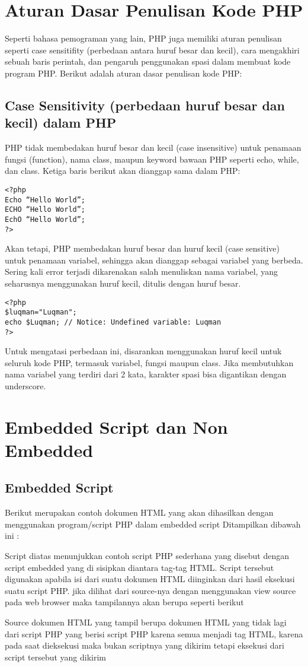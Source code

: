 \section{Aturan Dasar Penulisan Kode PHP}
Seperti bahasa pemograman yang lain, PHP juga memiliki aturan penulisan seperti case sensitifity (perbedaan antara huruf besar dan kecil), cara mengakhiri sebuah baris perintah, dan pengaruh penggunakan spasi dalam membuat kode program PHP. Berikut adalah aturan dasar penulisan kode PHP:
\subsection{Case Sensitivity (perbedaan huruf besar dan kecil) dalam PHP}
PHP tidak membedakan huruf besar dan kecil (case insensitive) untuk penamaan fungsi (function), nama class, maupun keyword bawaan PHP seperti echo, while, dan class. Ketiga baris berikut akan dianggap sama dalam PHP:
\begin{lstlisting}
<?php
Echo “Hello World”;
ECHO “Hello World”;
EchO “Hello World”;
?>
\end{lstlisting}
Akan tetapi, PHP membedakan huruf besar dan huruf kecil (case sensitive) untuk penamaan variabel, sehingga akan dianggap sebagai variabel yang berbeda. Sering kali error terjadi dikarenakan salah menuliskan nama variabel, yang seharusnya menggunakan huruf kecil, ditulis dengan huruf besar.
\begin{lstlisting}
<?php
$luqman="Luqman";
echo $Luqman; // Notice: Undefined variable: Luqman
?>
\end{lstlisting}
Untuk mengatasi perbedaan ini, disarankan menggunakan huruf kecil untuk seluruh kode PHP, termasuk variabel, fungsi maupun class. Jika membutuhkan nama variabel yang terdiri dari 2 kata, karakter spasi bisa digantikan dengan underscore.
\section{Embedded Script dan Non Embedded}
\subsection{Embedded Script}
  \item Berikut merupakan contoh dokumen HTML yang akan dihasilkan dengan menggunakan program/script PHP dalam embedded script
    Ditampilkan dibawah ini  :
    
Script diatas menunjukkan contoh script PHP sederhana yang disebut dengan script embedded yang di sisipkan diantara tag-tag HTML. Script tersebut digunakan apabila isi dari suatu dokumen HTML diinginkan dari hasil eksekusi suatu script PHP. jika dilihat dari source-nya dengan menggunakan view source pada web browser maka tampilannya akan berupa seperti berikut
    
Source dokumen HTML yang tampil berupa dokumen HTML yang tidak lagi dari script PHP yang berisi script PHP karena semua menjadi tag HTML, karena pada saat dieksekusi maka bukan scriptnya yang dikirim tetapi eksekusi dari script tersebut yang dikirim 
